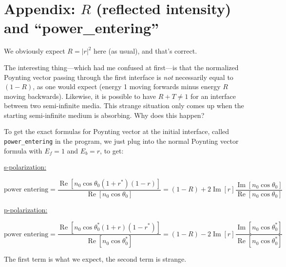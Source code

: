 \documentclass[12pt]{article}
\newcommand{\bskip}{\bigskip\noindent} %
\renewcommand{\(}{\left(}
\renewcommand{\)}{\right)}
\renewcommand{\Im}{\operatorname{Im}}
\renewcommand{\Re}{\operatorname{Re}}
\begin{document}
\newpage

\renewcommand{\thesection}{\Alph{section}}
\setcounter{section}{0}

\section{Appendix: $R$ (reflected intensity) and ``power\_entering''\label{appendixR}}

We obviously expect $R=|r|^2$ here (as usual), and that's correct.

The interesting thing---which had me confused at first---is that the normalized Poynting vector passing through the first interface is \emph{not} necessarily equal to $(1-R)$, as one would expect (energy 1 moving forwards minus energy $R$ moving backwards). Likewise, it is possible to have $R+T\neq 1$ for an interface between two semi-infinite media. This strange situation only comes up when the starting semi-infinite medium is absorbing. Why does this happen?

To get the exact formulas for Poynting vector at the initial interface, called \verb=power_entering= in the program, we just plug into the normal Poynting vector formula with $E_f = 1$ and $E_b = r$, to get:
\begin{center}\underline{s-polarization:}\end{center}
$$\text{power entering} = \frac{\Re \left[ n_0 \cos \theta_0  (1 + r^*) (1 -r) \right] }{\Re \left[ n_0 \cos \theta_0 \right] } = (1-R) + 2 \Im[r]\frac{\Im[n_0 \cos \theta_0]}{\Re[n_0 \cos\theta_0]}$$

\bskip\begin{center}\underline{p-polarization:}\end{center}
$$\text{power entering} = \frac{\Re \left[ n_0 \cos \theta_0^* (1 +r) (1 - r^*) \right] }{\Re \left[ n_0 \cos \theta_0^* \right] } = (1-R) - 2 \Im[r]\frac{\Im[n_0 \cos \theta_0^*]}{\Re[n_0 \cos\theta_0^*]}$$

The first term is what we expect, the second term is strange.
\end{document}
